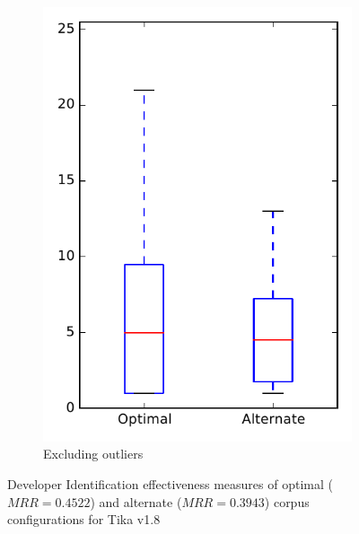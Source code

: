 \begin{figure}
\begin{subfigure}{.4\textwidth}
        \includegraphics[height=0.4\textheight]{figures/combo/dit_rq2_tika_no_outlier}
        \caption{Excluding outliers}\label{fig:combo:dit:rq2:tika_no_outlier}
    \end{subfigure}
\caption[Developer Identification effectiveness measures of optimal and alternate corpus configurations for Tika v1.8]%
{Developer Identification effectiveness measures of optimal ($MRR=0.4522$) and alternate ($MRR=0.3943$) corpus configurations for Tika v1.8}
\label{fig:combo:dit:rq2:tika}
\end{figure}
